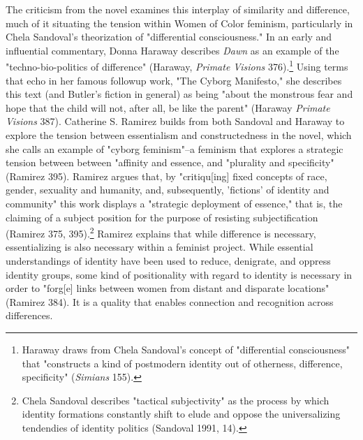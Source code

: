\documentclass[11pt]{article}
\begin{document}
The criticism from the novel examines this interplay of similarity and
difference, much of it situating the tension within Women of Color
feminism, particularly in Chela Sandoval's theorization of
"differential consciousness." In an early and influential commentary,
Donna Haraway describes \emph{Dawn} as an example of the
"techno-bio-politics of difference" (Haraway, \emph{Primate Visions}
376).\footnote{Haraway draws from Chela Sandoval's concept of "differential
consciousness" that "constructs a kind of postmodern identity out of
otherness, difference, specificity" (\emph{Simians} 155).} Using terms that echo in her famous followup work, "The
Cyborg Manifesto," she describes this text (and Butler's fiction in
general) as being "about the monstrous fear and hope that the child
will not, after all, be like the parent" (Haraway \emph{Primate Visions}
387). Catherine S. Ramirez builds from both Sandoval and Haraway to
explore the tension between essentialism and constructedness in the
novel, which she calls an example of "cyborg feminism"--a feminism
that explores a strategic tension between between "affinity and
essence, and "plurality and specificity" (Ramirez 395). Ramirez argues
that, by "critiqu[ing] fixed concepts of race, gender, sexuality and
humanity, and, subsequently, 'fictions' of identity and community"
this work displays a "strategic deployment of essence," that is, the
claiming of a subject position for the purpose of resisting
subjectification (Ramirez 375, 395).\footnote{Chela Sandoval describes "tactical subjectivity" as the process
by which identity formations constantly shift to elude and oppose the
universalizing tendendies of identity politics (Sandoval 1991, 14).} Ramirez explains that while
difference is necessary, essentializing is also necessary within a
feminist project. While essential understandings of identity have been
used to reduce, denigrate, and oppress identity groups, some kind of
positionality with regard to identity is necessary in order to
"forg[e] links between women from distant and disparate locations"
(Ramirez 384). It is a quality that enables connection and recognition
across differences.
\end{document}
